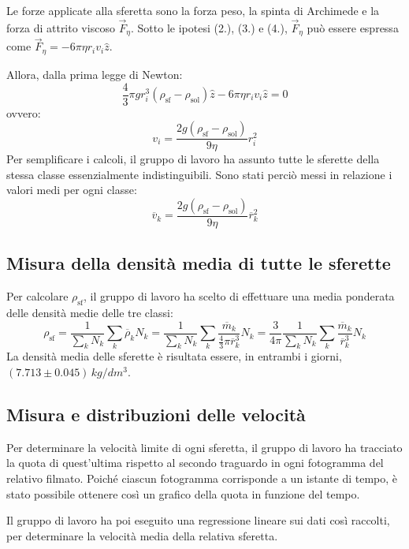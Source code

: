 \documentclass{article}
\begin{document}
\vspace{2mm}

Le forze applicate alla sferetta sono la forza peso, la spinta di Archimede
e la forza di attrito viscoso $\vec{F}_\eta$.
Sotto le ipotesi (2.), (3.) e (4.), $\vec{F}_\eta$ può essere espressa come
$\vec{F}_\eta = -6\pi\eta r_i v_i\hat{z}$.

Allora, dalla prima legge di Newton:
\[
  \frac{4}{3}\pi g r_i^3 (\rho_\text{sf} - \rho_\text{sol}) \hat{z}
  -6\pi\eta r_i v_i\hat{z} = 0
\]
ovvero:
\[
  v_i = \frac{2g(\rho_\text{sf} - \rho_\text{sol})}{9\eta} r_i^2
\]
Per semplificare i calcoli, il gruppo di lavoro ha assunto tutte le sferette
della stessa classe essenzialmente indistinguibili. Sono stati perciò messi
in relazione i valori medi per ogni classe: \[
  \overline{v}_k = \frac{2g(\rho_\text{sf} - \rho_\text{sol})}{9\eta}
  \overline{r}_k^2
\]

\subsection{Misura della densità media di tutte le sferette}
Per calcolare $\rho_\text{sf}$, il gruppo di lavoro ha scelto di
effettuare una media ponderata delle densità medie delle tre classi:
\[
  \rho_\text{sf} = \frac{1}{\sum_k N_k} \sum_k \overline{\rho}_k N_k
    = \frac{1}{\sum_k N_k} \sum_k \frac{\overline{m}_k}{
      \frac{4}{3}\pi \overline{r}_k^3} N_k
    = \frac{3}{4\pi} \frac{1}{\sum_k N_k} \sum_k \frac{\overline{m}_k}{
      \overline{r}_k^3} N_k
\]
La densità media delle sferette è risultata essere,
in entrambi i giorni, $(7.713\pm0.045)\,\unit{kg \per dm^3}$.

\subsection{Misura e distribuzioni delle velocità}
Per determinare la velocità limite di ogni sferetta, il gruppo di
lavoro ha tracciato la quota di quest'ultima rispetto al secondo traguardo
in ogni fotogramma del relativo filmato.
Poiché ciascun fotogramma corrisponde a un istante
di tempo, è stato possibile ottenere così un grafico della quota in funzione
del tempo.

Il gruppo di lavoro ha poi eseguito una regressione lineare sui dati così
raccolti, per determinare la velocità media della relativa sferetta.
\end{document}
